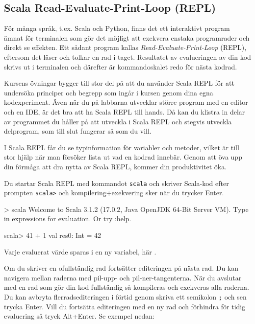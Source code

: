 \subsection{Scala Read-Evaluate-Print-Loop (REPL)}\label{appendix:compile:REPL}

För många språk, t.ex. Scala och Python, finns det ett interaktivt program ämnat för terminalen som gör det möjligt att exekvera enstaka programrader och direkt se effekten. Ett sådant program kallas \textit{Read-Evaluate-Print-Loop} (REPL), eftersom det läser  och tolkar en rad i taget. Resultatet av evalueringen av din kod skrivs ut i terminalen och därefter är kommandoskalet redo för nästa kodrad.

Kursens övningar bygger till stor del på att du använder Scala REPL för att undersöka principer och begrepp som ingår i kursen genom dina egna kodexperiment. Även när du på labbarna utvecklar större program med en editor och en IDE, är det bra att ha Scala REPL till hands. Då kan du klistra in delar av programmet du håller på att utveckla i Scala REPL och stegvis utveckla delprogram, som till slut fungerar så som du vill.

I Scala REPL får du se typinformation för variabler och metoder, vilket är till stor hjälp när man försöker lista ut vad en kodrad innebär. Genom att öva upp din förmåga att dra nytta av Scala REPL, kommer din produktivitet öka.

Du startar Scala REPL med kommandot \texttt{scala} och skriver Scala-kod efter prompten \texttt{scala>} och kompilering+exekvering sker när du trycker Enter.
\begin{REPLnonum}
> scala
Welcome to Scala 3.1.2 (17.0.2, Java OpenJDK 64-Bit Server VM).
Type in expressions for evaluation. Or try :help.
                                                                                                                               
scala> 41 + 1
val res0: Int = 42
\end{REPLnonum}

Varje evaluerat värde sparas i en ny variabel, här .

Om du skriver en ofullständig rad fortsätter editeringen på nästa rad. Du kan navigera mellan raderna med pil-upp- och pil-ner-tangenterna. När du avslutar med en rad som gör din kod fullständig så kompileras och exekveras alla raderna. Du kan avbryta flerradsediteringen i förtid genom skriva ett semikolon \texttt{;} och sen trycka Enter. Vill du fortsätta editeringen med en ny rad och förhindra för tidig evaluering så tryck Alt+Enter. Se exempel nedan:

